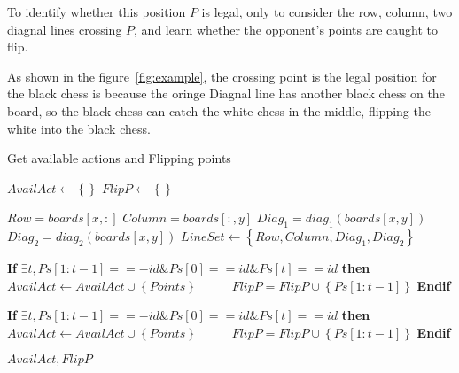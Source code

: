 \documentclass[10pt,twocolumn,letterpaper]{article}
\begin{document}
To identify whether this position $P$ is legal, 
only to consider the row, column, two diagnal lines 
crossing $P$, and learn whether the opponent's points are 
caught to flip.

As shown in the figure~\ref{fig:example}, the crossing 
point is the legal position for the black chess is because the oringe 
Diagnal line has another black chess on the board, so the black 
chess can catch the white chess in the middle, flipping the 
white into the black chess.

\begin{algorithm}[h]
	\caption{Get available actions and Flipping points}
	\begin{algorithmic}[1]
      \State $AvailAct \gets \left\{\right\}$
      \State $FlipP \gets \left\{\right\}$
         
         \State $Row = boards\left[x, :\right]$
         \State $Column = boards\left[:, y\right]$
         \State $Diag_1 = diag_1\left(boards\left[x, y\right]\right)$
         \State $Diag_2 = diag_2\left(boards\left[x, y\right]\right)$
         \State $LineSet \gets \left\{Row, Column, Diag_1, Diag_2\right\}$


               \State \textbf{If} $\exists t, Ps[1:t-1] ==-id \textbf{\&} Ps[0] == id \textbf{\&} Ps[t] == id$ \textbf{then}
                  \State \ \ \ \ \ $AvailAct \gets AvailAct \cup \left\{Points\right\}$
                  \State \ \ \ \ \ $FlipP = FlipP \cup \left\{Ps[1:t-1]\right\}$
               \State \textbf{Endif}
            \EndFor

            \State \textbf{If} $\exists t, Ps[1:t-1] == -id \textbf{\&} Ps[0] == id \textbf{\&} Ps[t] == id$ \textbf{then}
            \State \ \ \ \ \ $AvailAct \gets AvailAct \cup \left\{Points\right\}$
            \State \ \ \ \ \ $FlipP = FlipP \cup \left\{Ps[1:t-1]\right\}$               \State \textbf{Endif}
            \EndFor
         \EndFor

      \EndFor
		\State \Return $AvailAct, FlipP$
	
      \EndFunction
      
	\end{algorithmic}
\end{algorithm}
\end{document}
